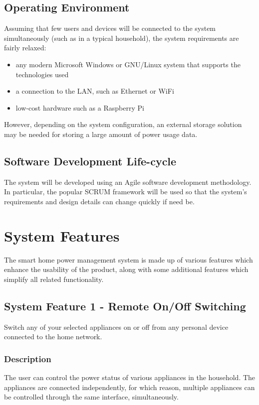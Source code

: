 \documentclass[11pt, a4paper]{article}
\begin{document}
	\subsection{Operating Environment}
	Assuming that few users and devices will be connected to the system simultaneously (such as in a typical household), the system requirements are fairly relaxed:
	\begin{itemize}
		\item any modern Microsoft Windows or GNU/Linux system that supports the technologies used
		\item a connection to the LAN, such as Ethernet or WiFi
		\item low-cost hardware such as a Raspberry Pi
	\end{itemize}
	However, depending on the system configuration, an external storage solution may be needed for storing a large amount of power usage data.
	
	
	\subsection{Software Development Life-cycle}
	The system will be developed using an Agile software development methodology. In particular, the popular SCRUM framework will be used so that the system's requirements and design details can change quickly if need be. 
	
	
	\section{System Features}
	The smart home power management system is made up of various features which enhance the usability of the product, along with some additional features which simplify all related functionality.
	\subsection{System Feature 1 - Remote On/Off Switching} 
	Switch any of your selected appliances on or off from any personal device connected to the home network. 
	\subsubsection{Description}
	The user can control the power status of various appliances in the household. The appliances are connected independently, for which reason, multiple appliances can be controlled through the same interface, simultaneously. 
\end{document}
